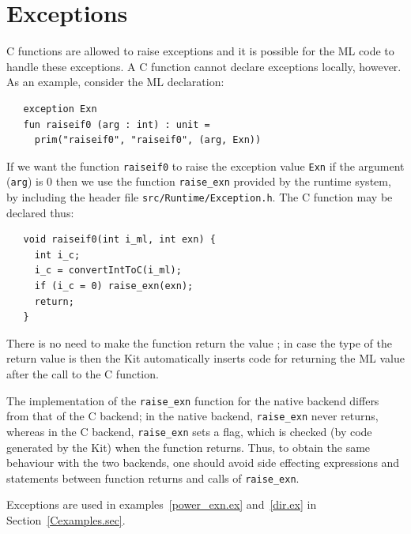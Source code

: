 \documentclass[12pt]{book}
\begin{document}
\section{Exceptions}
\label{C_exceptions.sec}
C functions are allowed to raise exceptions and it is possible for the
ML code to handle these exceptions. A C function cannot declare
exceptions locally, however. As an example, consider the ML
declaration:
\begin{verbatim}
   exception Exn
   fun raiseif0 (arg : int) : unit = 
     prim("raiseif0", "raiseif0", (arg, Exn))
\end{verbatim}
If we want the function \texttt{raiseif0} to raise the exception value
\texttt{Exn} if the argument (\texttt{arg}) is 0 then we use the
function \verb|raise_exn| provided by the runtime system, by
including the header file {\tt src/Runtime/Exception.h}. The C
function  may be declared thus:
\begin{verbatim}
   void raiseif0(int i_ml, int exn) {
     int i_c;
     i_c = convertIntToC(i_ml);
     if (i_c = 0) raise_exn(exn);
     return;
   }
\end{verbatim}
There is no need to make the function return the value ;
in case the type of the return value is  then the Kit
automatically inserts code for returning the ML value \boxml{()} after
the call to the C function.

The implementation of the \verb|raise_exn| function for the native
backend differs from that of the C backend; in the native backend,
\verb|raise_exn| never returns, whereas in the C backend,
\verb|raise_exn| sets a flag, which is checked (by code generated by
the Kit) when the function returns. Thus, to obtain the same behaviour
with the two backends, one should avoid side effecting expressions and
statements between function returns and calls of \verb|raise_exn|.

Exceptions are used in examples~\ref{power_exn.ex} and~\ref{dir.ex} in
Section~\ref{Cexamples.sec}.

\end{document}
